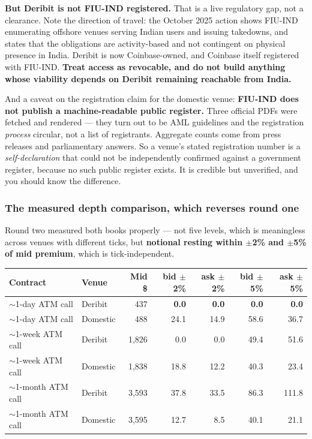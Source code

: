 \documentclass[11pt,a4paper]{article}
\newcommand{\srcnote}[1]{{\footnotesize\color{soft}#1\par}}
\begin{document}
\textbf{But Deribit is not FIU-IND registered.} That is a live regulatory gap, not
a clearance. Note the direction of travel: the October 2025 action shows FIU-IND
enumerating offshore venues serving Indian users and issuing takedowns, and states
that the obligations are activity-based and not contingent on physical presence in
India. Deribit is now Coinbase-owned, and Coinbase itself registered with FIU-IND.
\textbf{Treat access as revocable, and do not build anything whose viability
depends on Deribit remaining reachable from India.}

\srcnote{And a caveat on the registration claim for the domestic venue: \textbf{FIU-IND
does not publish a machine-readable public register.} Three official PDFs were
fetched and rendered --- they turn out to be AML guidelines and the registration
\emph{process} circular, not a list of registrants. Aggregate counts come from
press releases and parliamentary answers. So a venue's stated registration number
is a \emph{self-declaration} that could not be independently confirmed against a
government register, because no such public register exists. It is credible but
unverified, and you should know the difference.}

\subsubsection{The measured depth comparison, which reverses round one}

Round two measured both books properly --- not five levels, which is meaningless
across venues with different ticks, but \textbf{notional resting within $\pm$2\%
and $\pm$5\% of mid premium}, which is tick-independent.

\begin{center}
\begin{tabular}{@{}llrrrrr@{}}
\toprule
Contract & Venue & Mid \$ & bid $\pm$2\% & ask $\pm$2\% & bid $\pm$5\% & ask $\pm$5\% \\
\midrule
$\sim$1-day ATM call  & Deribit & 437 & \textbf{0.0} & \textbf{0.0} & \textbf{0.0} & \textbf{0.0} \\
$\sim$1-day ATM call  & Domestic & 488 & 24.1 & 14.9 & 58.6 & 36.7 \\
$\sim$1-week ATM call & Deribit & 1{,}826 & 0.0 & 0.0 & 49.4 & 51.6 \\
$\sim$1-week ATM call & Domestic & 1{,}838 & 18.8 & 12.2 & 40.3 & 23.4 \\
$\sim$1-month ATM call& Deribit & 3{,}593 & 37.8 & 33.5 & 86.3 & 111.8 \\
$\sim$1-month ATM call& Domestic & 3{,}595 & 12.7 & 8.5 & 40.1 & 21.1 \\
\bottomrule
\end{tabular}
\end{center}
\end{document}
